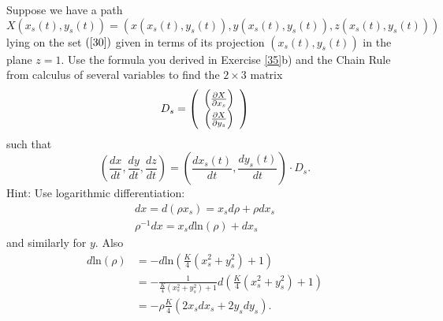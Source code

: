 \documentclass{ximera}
\begin{document}
\begin{exercise}
\label{37}Suppose we have a path%
\[
X\left(  x_{s}\left(  t\right)  ,y_{s}\left(  t\right)  \right)  =\left(
x\left(  x_{s}\left(  t\right)  ,y_{s}\left(  t\right)  \right)  ,y\left(
x_{s}\left(  t\right)  ,y_{s}\left(  t\right)  \right)  ,z\left(  x_{s}\left(
t\right)  ,y_{s}\left(  t\right)  \right)  \right)
\]
lying on the set $\left(  \ref{30}\right)  $ given in terms of its projection
$\left(  x_{s}\left(  t\right)  ,y_{s}\left(  t\right)  \right)  $ in the
plane $z=1$. Use the formula you derived in Exercise \ref{35}b) and the Chain
Rule from calculus of several variables to find the $2\times3$ matrix%
\[
D_{s}=\left(
\begin{array}
[c]{c}%
\left(  \frac{\partial X}{\partial x_{s}}\right) \\
\left(  \frac{\partial X}{\partial y_{s}}\right)
\end{array}
\right)
\]
such that%
\[
\left(  \frac{dx}{dt},\frac{dy}{dt},\frac{dz}{dt}\right)  =\left(
\frac{dx_{s}\left(  t\right)  }{dt},\frac{dy_{s}\left(  t\right)  }%
{dt}\right)  \cdot D_{s}.
\]
Hint: Use logarithmic differentiation:%
\begin{gather*}
dx=d\left(  \rho x_{s}\right)  =x_{s}d\rho+\rho dx_{s}\\
\rho^{-1}dx=x_{s}d\mathrm{ln}\left(  \rho\right)  +dx_{s}%
\end{gather*}
and similarly for $y$. Also%
\begin{align*}
d\mathrm{ln}\left(  \rho\right)   &  =-d\mathrm{ln}\left(  \frac{K}{4}\left(
x_{s}^{2}+y_{s}^{2}\right)  +1\right) \\
&  =-\frac{1}{\frac{K}{4}\left(  x_{s}^{2}+y_{s}^{2}\right)  +1}d\left(
\frac{K}{4}\left(  x_{s}^{2}+y_{s}^{2}\right)  +1\right) \\
&  =-\rho\frac{K}{4}\left(  2x_{s}dx_{s}+2y_{s}dy_{s}\right)  .
\end{align*}

\end{exercise}
\end{document}
